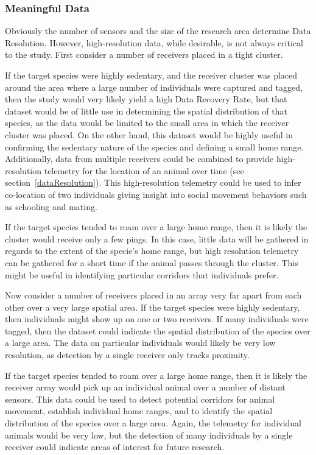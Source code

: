 \subsubsection{Meaningful Data}
\label{meaningfulData}
Obviously the number of sensors and the size of the research area determine Data Resolution.  However, high-resolution data, while desirable, is not always critical to the study.  First consider a number of receivers placed in a tight cluster.

If the target species were highly sedentary, and the receiver cluster was placed around the area where a large number of individuals were captured and tagged, then the study would very likely yield a high Data Recovery Rate, but that dataset would be of little use in determining the spatial distribution of that species, as the data would be limited to the small area in which the receiver cluster was placed.  On the other hand, this dataset would be highly useful in confirming the sedentary nature of the species and defining a small home range.  Additionally, data from multiple receivers could be combined to provide high-resolution telemetry for the location of an animal over time (see section~\ref{dataResolution}).  This high-resolution telemetry could be used to infer co-location of two individuals giving insight into social movement behaviors such as schooling and mating.  

If the target species tended to roam over a large home range, then it is likely the cluster would receive only a few pings.  In this case, little data will be gathered in regards to the extent of the specie's home range, but high resolution telemetry can be gathered for a short time if the animal passes through the cluster.  This might be useful in identifying particular corridors that individuals prefer.

Now consider a number of receivers placed in an array very far apart from each other over a very large spatial area.
If the target species were highly sedentary, then individuals might show up on one or two receivers.  If many individuals were tagged, then the dataset could indicate the spatial distribution of the species over a large area.  The data on particular individuals would likely be very low resolution, as detection by a single receiver only tracks proximity.  

If the target species tended to roam over a large home range, then it is likely the receiver array would pick up an individual animal over a number of distant sensors.  This data could be used to detect potential corridors for animal movement, establish individual home ranges, and to identify the spatial distribution of the species over a large area.  Again, the telemetry for individual animals would be very low, but the detection of many individuals by a single receiver could indicate areas of interest for future research.

